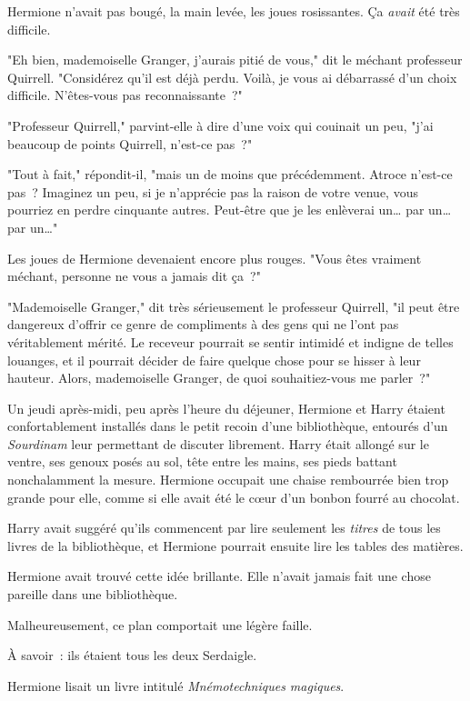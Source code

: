 Hermione n'avait pas bougé, la main levée, les joues rosissantes. Ça \emph{avait} été très difficile.

"Eh bien, mademoiselle Granger, j'aurais pitié de vous," dit le méchant professeur Quirrell. "Considérez qu'il est déjà perdu. Voilà, je vous ai débarrassé d'un choix difficile. N'êtes-vous pas reconnaissante~?"

"Professeur Quirrell," parvint-elle à dire d'une voix qui couinait un peu, "j'ai beaucoup de points Quirrell, n'est-ce pas~?"

"Tout à fait," répondit-il, "mais un de moins que précédemment. Atroce n'est-ce pas~? Imaginez un peu, si je n'apprécie pas la raison de votre venue, vous pourriez en perdre cinquante autres. Peut-être que je les enlèverai un… par un… par un…"

Les joues de Hermione devenaient encore plus rouges. "Vous êtes vraiment méchant, personne ne vous a jamais dit ça~?"

"Mademoiselle Granger," dit très sérieusement le professeur Quirrell, "il peut être dangereux d'offrir ce genre de compliments à des gens qui ne l'ont pas véritablement mérité. Le receveur pourrait se sentir intimidé et indigne de telles louanges, et il pourrait décider de faire quelque chose pour se hisser à leur hauteur. Alors, mademoiselle Granger, de quoi souhaitiez-vous me parler~?"

\later

Un jeudi après-midi, peu après l'heure du déjeuner, Hermione et Harry étaient confortablement installés dans le petit recoin d'une bibliothèque, entourés d'un \emph{Sourdinam} leur permettant de discuter librement. Harry était allongé sur le ventre, ses genoux posés au sol, tête entre les mains, ses pieds battant nonchalamment la mesure. Hermione occupait une chaise rembourrée bien trop grande pour elle, comme si elle avait été le cœur d'un bonbon fourré au chocolat.

Harry avait suggéré qu'ils commencent par lire seulement les \emph{titres} de tous les livres de la bibliothèque, et Hermione pourrait ensuite lire les tables des matières.

Hermione avait trouvé cette idée brillante. Elle n'avait jamais fait une chose pareille dans une bibliothèque.

Malheureusement, ce plan comportait une légère faille.

À savoir~: ils étaient tous les deux Serdaigle.

Hermione lisait un livre intitulé \emph{Mnémotechniques magiques}.

